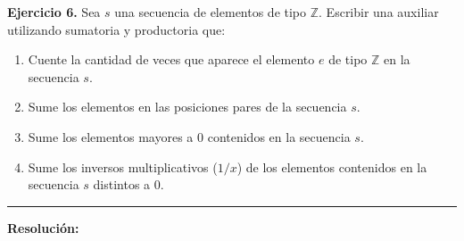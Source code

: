 \hypertarget{ej6}{}
\noindent \textbf{Ejercicio 6.} Sea $s$ una secuencia de elementos de tipo $\mathbb{Z}$. Escribir una auxiliar utilizando sumatoria y productoria que:

\begin{enumerate}[label=\alph*)]
    \item Cuente la cantidad de veces que aparece el elemento $e$ de tipo $\mathbb{Z}$ en la secuencia $s$.
    \item Sume los elementos en las posiciones pares de la secuencia $s$.
    \item Sume los elementos mayores a 0 contenidos en la secuencia $s$.
    \item Sume los inversos multiplicativos ($1/x$) de los elementos contenidos en la secuencia $s$ distintos a 0.
\end{enumerate}

\vspace{0.2cm}
{\color{gray}\hrule}
\vspace{0.4cm}

\textbf{Resolución:}

